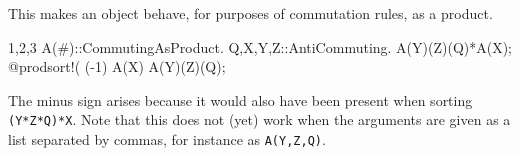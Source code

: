 
This makes an object behave, for purposes of commutation rules, as a
product. 
\begin{screen}{1,2,3}
A(#)::CommutingAsProduct.
{Q,X,Y,Z}::AntiCommuting.
A(Y)(Z)(Q)*A(X);
@prodsort!(%
(-1) A(X) A(Y)(Z)(Q);
\end{screen}
The minus sign arises because it would also have been present when
sorting {\tt (Y*Z*Q)*X}. 
Note that this does not (yet) work when the arguments are given as a
list separated by commas, for instance as {\tt A(Y,Z,Q)}.


